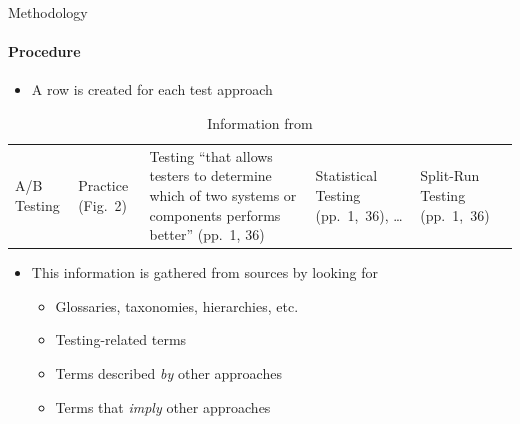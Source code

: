 \documentclass{beamer}
\begin{document}
\begin{frame}{Methodology}
    \framesubtitle{Procedure}
    \begin{itemize}
        \item A row is created for each test approach
    \end{itemize}
    \begin{center}
        \begin{table}
            \small
            \begin{tabularx}{\linewidth}{|M{1.1cm}|M{1.3cm}|X|M{1.5cm}|M{1.6cm}|}
                \hline
                 &  &                                                                                          &                        &            \\
                \hline
                A/B Testing           & Practice {\tiny (Fig.~2)} & Testing ``that allows testers to determine which of two systems or components performs better'' {\tiny (pp.~1, 36)} & Statistical Testing {\tiny (pp.~1,~36)}, \dots{} & Split-Run Testing {\tiny (pp.~1,~36)} \\
                \hline
            \end{tabularx}
            \caption{\tiny Information from \citep{IEEE2022}}
        \end{table}
    \end{center}
    \pause \vspace{-0.5cm}
    \begin{itemize}
        \item This information is gathered from sources by looking for
              \begin{itemize}
                  \item Glossaries, taxonomies, hierarchies, etc.
                  \item Testing-related terms
                  \item Terms described \emph{by} other approaches
                  \item Terms that \emph{imply} other approaches
              \end{itemize}
    \end{itemize}
\end{frame}
\end{document}
